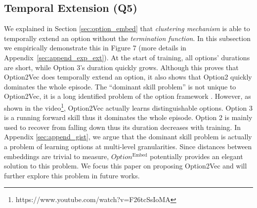 \documentclass[10pt,journal,compsoc]{IEEEtran}
\newcommand{\linkblue}[1]{\textcolor[HTML]{2E649E}{#1}}
\renewcommand{\cite}{\citep}
\begin{document}
\subsection{Temporal Extension (Q5)}
\label{sec:exp_ext}
We  explained in Section \ref{sec:option_embed} that
\emph{clustering mechanism} is able to temporally extend an
option without the \emph{termination function}. In this subsection we empirically demonstrate this in Figure \linkblue{7}
(more details in Appendix~\ref{sec:append_exp_ext}). 
At the start of training, all options' durations are short, while Option 3's
duration quickly grows. Although this proves that Option2Vec does
temporally extend an option, it also shows that Option2 quickly
dominates the whole episode. The ``dominant skill problem'' is
not unique to Option2Vec, it is a long identified problem of the
option framework \cite{haarnoja2018latent}. However, as shown in
the \linkblue{video}\footnote{\linkblue{https://www.youtube.com/watch?v=F26tcSsIoMA}},
Option2Vec actually learns distinguishable options. Option 3 is a
running forward skill thus it dominates the whole episode. Option
2 is mainly used to recover from falling down thus its duration
decreases with training. In Appendix \ref{sec:append_gist}, we
argue that the dominant skill problem is actually a problem of
learning options at multi-level granularities. Since distances
between embeddings are trivial to measure, $Option^{\textrm{Embed}}$
potentially provides an elegant solution to this problem. We
focus this paper on proposing Option2Vec and will further explore this problem in future works.
\end{document}

